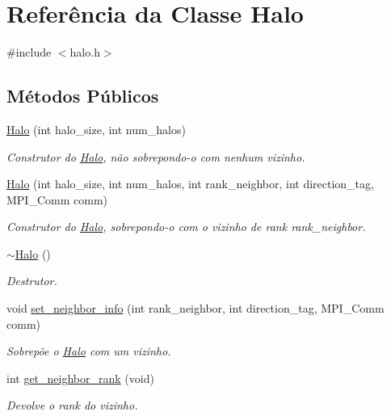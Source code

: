 \hypertarget{classHalo}{
\section{Referência da Classe Halo}
\label{classHalo}
}


{\ttfamily \#include $<$halo.h$>$}

\subsection*{Métodos Públicos}
\begin{DoxyCompactItemize}
\item 
\hyperlink{classHalo_adab5e53317b1cf32558d66a1b8052ea0}{Halo} (int halo\_\-size, int num\_\-halos)
\begin{DoxyCompactList}\small\item\em Construtor do \hyperlink{classHalo}{Halo}, não sobrepondo-\/o com nenhum vizinho. \item\end{DoxyCompactList}\item 
\hyperlink{classHalo_a9769c8e449f3e4ea6cd8a398a2ad45d8}{Halo} (int halo\_\-size, int num\_\-halos, int rank\_\-neighbor, int direction\_\-tag, MPI\_\-Comm comm)
\begin{DoxyCompactList}\small\item\em Construtor do \hyperlink{classHalo}{Halo}, sobrepondo-\/o com o vizinho de rank rank\_\-neighbor. \item\end{DoxyCompactList}\item 
\hyperlink{classHalo_af14b14344802b6c82d9099f49b74b004}{$\sim$Halo} ()
\begin{DoxyCompactList}\small\item\em Destrutor. \item\end{DoxyCompactList}\item 
void \hyperlink{classHalo_a38eff5fb365854da750295ffb7bcab39}{set\_\-neighbor\_\-info} (int rank\_\-neighbor, int direction\_\-tag, MPI\_\-Comm comm)
\begin{DoxyCompactList}\small\item\em Sobrepõe o \hyperlink{classHalo}{Halo} com um vizinho. \item\end{DoxyCompactList}\item 
int \hyperlink{classHalo_a9582022dcf67b5ae988b322fa528e782}{get\_\-neighbor\_\-rank} (void)
\begin{DoxyCompactList}\small\item\em Devolve o rank do vizinho. \item\end{DoxyCompactList}\item 

\end{DoxyCompactItemize}
